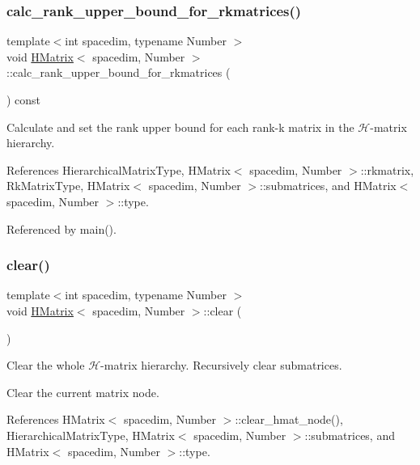 \subsubsection{\texorpdfstring{calc\+\_\+rank\+\_\+upper\+\_\+bound\+\_\+for\+\_\+rkmatrices()}{calc\_rank\_upper\_bound\_for\_rkmatrices()}}
{\footnotesize\ttfamily template$<$int spacedim, typename Number $>$ \\
void \hyperlink{classHMatrix}{H\+Matrix}$<$ spacedim, Number $>$\+::calc\+\_\+rank\+\_\+upper\+\_\+bound\+\_\+for\+\_\+rkmatrices (\begin{DoxyParamCaption}{ }\end{DoxyParamCaption}) const}

Calculate and set the rank upper bound for each rank-\/k matrix in the $\mathcal{H}$-\/matrix hierarchy. 

References Hierarchical\+Matrix\+Type, H\+Matrix$<$ spacedim, Number $>$\+::rkmatrix, Rk\+Matrix\+Type, H\+Matrix$<$ spacedim, Number $>$\+::submatrices, and H\+Matrix$<$ spacedim, Number $>$\+::type.



Referenced by main().

\mbox{\label{classHMatrix_ae55bd45587b895bfdb977e7cbea46519}} 
\subsubsection{\texorpdfstring{clear()}{clear()}}
{\footnotesize\ttfamily template$<$int spacedim, typename Number $>$ \\
void \hyperlink{classHMatrix}{H\+Matrix}$<$ spacedim, Number $>$\+::clear (\begin{DoxyParamCaption}{ }\end{DoxyParamCaption})}

Clear the whole $\mathcal{H}$-\/matrix hierarchy. Recursively clear submatrices.

Clear the current matrix node.

References H\+Matrix$<$ spacedim, Number $>$\+::clear\+\_\+hmat\+\_\+node(), Hierarchical\+Matrix\+Type, H\+Matrix$<$ spacedim, Number $>$\+::submatrices, and H\+Matrix$<$ spacedim, Number $>$\+::type.

\mbox{\label{classHMatrix_aec0815bc9c3654391bb2b3095383e6cb}} 
